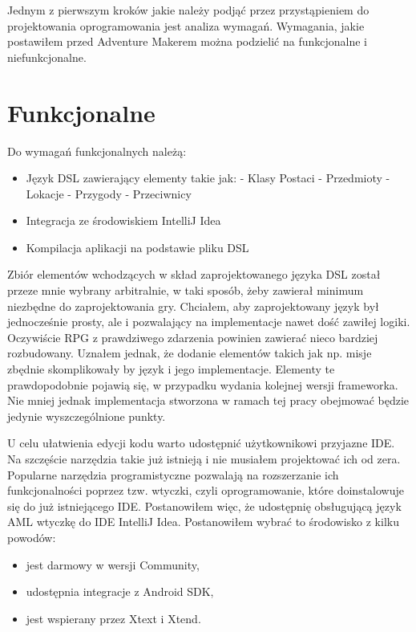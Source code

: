 \documentclass{xmgr}
\begin{document}
Jednym z pierwszym kroków jakie należy podjąć przez przystąpieniem do projektowania oprogramowania jest analiza wymagań. Wymagania, jakie postawiłem przed Adventure Makerem można podzielić na funkcjonalne i niefunkcjonalne.

\section{Funkcjonalne}
Do wymagań funkcjonalnych należą:
\begin{itemize}
\item Język DSL zawierający elementy takie jak:
\subitem - Klasy Postaci
\subitem - Przedmioty
\subitem - Lokacje
\subitem - Przygody
\subitem - Przeciwnicy
\item Integracja ze środowiskiem IntelliJ Idea
\item Kompilacja aplikacji na podstawie pliku DSL 
\end{itemize}

Zbiór elementów wchodzących w skład zaprojektowanego języka DSL został przeze mnie wybrany arbitralnie, w taki sposób, żeby zawierał minimum niezbędne do zaprojektowania gry. Chciałem, aby zaprojektowany język był jednocześnie prosty, ale i pozwalający na implementacje nawet dość zawiłej logiki. Oczywiście RPG z prawdziwego zdarzenia powinien zawierać nieco bardziej rozbudowany. Uznałem jednak, że dodanie elementów takich jak np. misje zbędnie skomplikowały by język i jego implementacje. Elementy te prawdopodobnie pojawią się, w przypadku wydania kolejnej wersji frameworka. Nie mniej jednak implementacja stworzona w ramach tej pracy obejmować będzie jedynie wyszczególnione punkty.

U celu ułatwienia edycji kodu warto udostępnić użytkownikowi przyjazne IDE. Na szczęście narzędzia takie już istnieją i nie musiałem projektować ich od zera. Popularne narzędzia programistyczne pozwalają na rozszerzanie ich funkcjonalności poprzez tzw. wtyczki, czyli oprogramowanie, które doinstalowuje się do już istniejącego IDE. Postanowiłem więc, że udostępnię obsługującą język AML wtyczkę do IDE IntelliJ Idea. Postanowiłem wybrać to środowisko z kilku powodów:
\begin{itemize}	
\item jest darmowy w wersji Community,
\item udostępnia integracje z Android SDK,
\item jest wspierany przez Xtext i Xtend.
\end{itemize}
\end{document}
